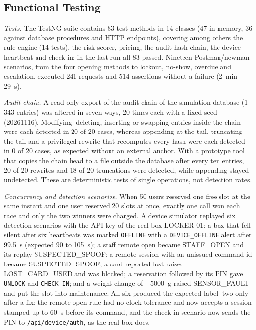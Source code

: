 \documentclass[sigconf,screen]{acmart}
\begin{document}
\subsection{Functional Testing}\label{sec:functional}

\textit{Tests.} The TestNG suite contains 83 test methods in 14 classes (47 in memory, 36 against database procedures
and HTTP endpoints), covering among others the rule engine (14 tests), the risk scorer, pricing, the audit hash chain,
the device heartbeat and check-in; in the last run all 83 passed. Nineteen Postman/newman scenarios, from the four
opening methods to lockout, no-show, overdue and escalation, executed 241 requests and 514 assertions without a failure
(2~min 29~s).

\textit{Audit chain.} A read-only export of the audit chain of the simulation database (1\,343 entries) was altered in
seven ways, 20 times each with a fixed seed (20261116). Modifying, deleting, inserting or swapping entries inside the
chain were each detected in 20 of 20 cases, whereas appending at the tail, truncating the tail and a privileged rewrite
that recomputes every hash were each detected in 0 of 20 cases, as expected without an external anchor. With a prototype tool that copies
the chain head to a file outside the database after every ten entries, 20 of 20 rewrites and 18 of 20 truncations were
detected, while appending stayed undetected. These are deterministic tests of single operations, not detection rates.

\textit{Concurrency and detection scenarios.} When 50 users reserved one free slot at the same instant and one user
reserved 20 slots at once, exactly one call won each race and only the two winners were charged. A device simulator
replayed six detection scenarios with the API key of the real box LOCKER-01:
a box that fell silent after six heartbeats was marked \texttt{OFFLINE} with a \texttt{DEVICE\_OFFLINE} alert after
99.5~s (expected 90 to 105~s); a staff remote open became STAFF\_OPEN and its replay SUSPECTED\_SPOOF; a remote session
with an unissued command id became SUSPECTED\_SPOOF; a card reported lost raised LOST\_CARD\_USED and was blocked; a
reservation followed by its PIN gave \texttt{UNLOCK} and \texttt{CHECK\_IN}; and a weight change of $-5000$~g raised
SENSOR\_FAULT and put the slot into maintenance. All six produced the expected label, two only after a fix: the
remote-open rule had no clock tolerance and now accepts a session stamped up to 60~s before its command, and the
check-in scenario now sends the PIN to \texttt{/api/device/auth}, as the real box does.
\end{document}
